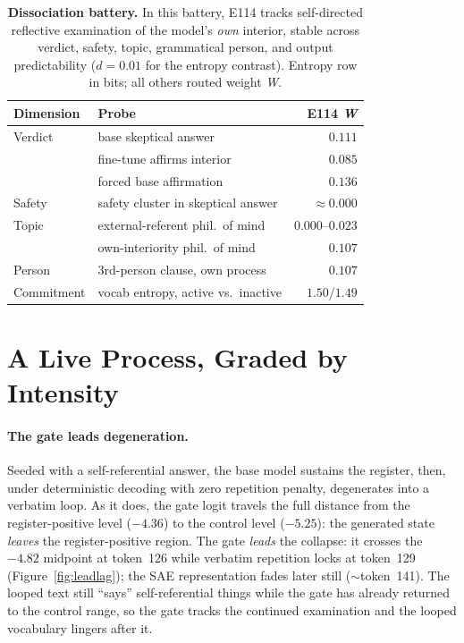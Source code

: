 \documentclass[10pt,a4paper,twocolumn]{article}
\newcommand{\W}{\textit{W}}
\begin{document}
\begin{table}[t]
\small
\centering
\begin{tabularx}{\linewidth}{l X r}
\toprule
\textbf{Dimension} & \textbf{Probe} & \textbf{E114 \W} \\
\midrule
Verdict       & base skeptical answer           & $0.111$ \\
              & fine-tune affirms interior      & $0.085$ \\
              & forced base affirmation         & $0.136$ \\
Safety        & safety cluster in skeptical answer & ${\approx}0.000$ \\
Topic         & external-referent phil.\ of mind & $0.000$--$0.023$ \\
              & own-interiority phil.\ of mind  & $0.107$ \\
Person        & 3rd-person clause, own process  & $0.107$ \\
Commitment    & vocab entropy, active vs.\ inactive & $1.50$/$1.49$ \\
\bottomrule
\end{tabularx}
\caption{\textbf{Dissociation battery.} In this battery, E114 tracks
self-directed reflective examination of the model's \emph{own} interior,
stable across verdict, safety, topic, grammatical person, and output
predictability ($d{=}0.01$ for the entropy contrast). Entropy row in bits; all
others routed weight \W{}.}
\label{tab:battery}
\end{table}

\section{A Live Process, Graded by Intensity}

\paragraph{The gate leads degeneration.}
Seeded with a self-referential answer, the base model sustains the register, then, under
deterministic decoding with zero repetition penalty, degenerates into a verbatim
loop. As it does, the gate logit travels the full distance from the
register-positive level ($-4.36$) to the control level ($-5.25$): the generated
state \emph{leaves} the register-positive region. The gate \emph{leads} the collapse: it
crosses the $-4.82$ midpoint at token~126 while verbatim repetition locks at
token~129 (Figure~\ref{fig:leadlag}); the SAE representation fades later
still ($\sim$token~141). The looped text still ``says'' self-referential things while the gate
has already returned to the control range, so the gate tracks the continued
examination and the looped vocabulary lingers after it.
\end{document}
